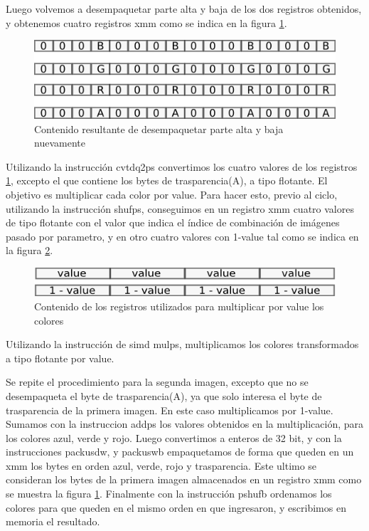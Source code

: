\documentclass[a4paper]{article}
\begin{document}
Luego volvemos a desempaquetar parte alta y baja de los dos registros obtenidos, y obtenemos cuatro registros xmm como se indica en la figura \ref{cuartoXmm}.


\begin{figure}[H]
\centering
\includegraphics[scale=0.8]{imagenes/cuartoXmm.png}
\caption{Contenido resultante de desempaquetar parte alta y baja nuevamente}
\label{cuartoXmm}
\end{figure}

Utilizando la instrucción cvtdq2ps convertimos los cuatro valores de los registros \ref{cuartoXmm}, excepto el que contiene los bytes de trasparencia(A), a tipo flotante. El objetivo es multiplicar cada color por value. Para hacer esto, previo al ciclo, utilizando la instrucción shufps, conseguimos en un registro xmm cuatro valores de tipo flotante con el valor que indica el índice de combinación de imágenes pasado por parametro, y en otro cuatro valores con 1-value tal como se indica en la figura \ref{value}.

\begin{figure}[H]
\centering
\includegraphics[scale=0.8]{imagenes/value.png}
\caption{Contenido de los registros utilizados para multiplicar por value los colores}
\label{value}
\end{figure}


Utilizando la instrucción de simd mulps, multiplicamos los colores transformados a tipo flotante por value.

Se repite el procedimiento para la segunda imagen, excepto que no se desempaqueta el byte de trasparencia(A), ya que solo interesa el byte de trasparencia de la primera imagen. En este caso multiplicamos por 1-value. Sumamos con la instruccion addps los valores obtenidos en la multiplicación, para los colores azul, verde y rojo. Luego convertimos a enteros de 32 bit, y con la instrucciones packusdw, y packuswb empaquetamos de forma que queden en un xmm los bytes en orden azul, verde, rojo y trasparencia. Este ultimo se consideran los bytes de la primera imagen almacenados en un registro xmm como se muestra la figura \ref{cuartoXmm}. Finalmente con la instrucción pshufb ordenamos los colores para que queden en el mismo orden en que ingresaron, y escribimos en memoria el resultado.
\end{document}
